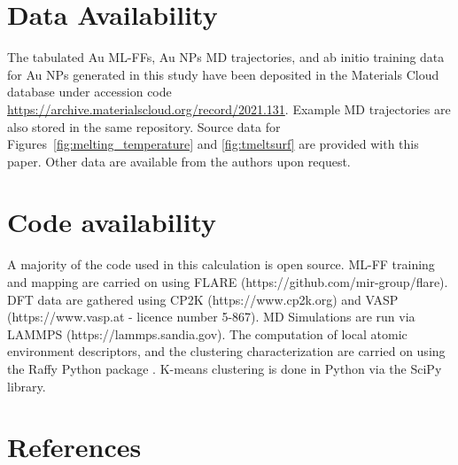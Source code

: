 \documentclass[%
aip,
 amsmath,amssymb,
 reprint,
]{revtex4-1}
\begin{document}
\section*{Data Availability}
%
The tabulated Au ML-FFs, Au NPs MD trajectories, and ab initio training data for Au NPs generated in this study have been deposited in the Materials Cloud database under accession code
\href{https://archive.materialscloud.org/record/2021.131}{https://archive.materialscloud.org/record/2021.131}. \cite{materialscloud}
%
Example MD trajectories are also stored in the same repository.
%
Source data for Figures~\ref{fig:melting_temperature} and \ref{fig:tmeltsurf} are provided with this paper.
%
Other data are available from the authors upon request.


\section*{Code availability}
%
A majority of the code used in this calculation is open source.
%
ML-FF training and mapping are carried on using FLARE (https://github.com/mir-group/flare). 
%
DFT data are gathered using CP2K (https://www.cp2k.org) and VASP (https://www.vasp.at - licence number 5-867). 
%
MD Simulations are run via LAMMPS (https://lammps.sandia.gov).
%
The computation of local atomic environment descriptors, and the clustering characterization are carried on using the Raffy Python package \cite{Raffy}.
%
K-means clustering is done in Python via the SciPy library.

\section*{References}


\end{document}
